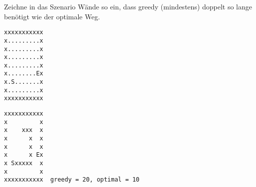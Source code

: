 \question[2]
Zeichne in das Szenario Wände so ein, dass greedy (mindestens) doppelt so
lange benötigt wie der optimale Weg.
\begin{lstlisting}
xxxxxxxxxxx
x.........x
x.........x
x.........x
x.........x
x........Ex
x.S.......x
x.........x
xxxxxxxxxxx
\end{lstlisting}
\begin{solutionbox}{4cm}
\begin{lstlisting}
xxxxxxxxxxx
x         x
x    xxx  x
x      x  x
x      x  x
x      x Ex
x Sxxxxx  x
x         x
xxxxxxxxxxx  greedy = 20, optimal = 10
\end{lstlisting}
\end{solutionbox}
